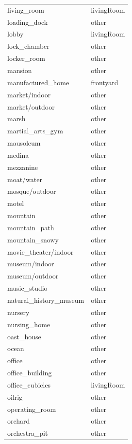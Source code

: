 \begin{table}[h!]
\begin{tabular}{| l | l |}
		living\_room &   livingRoom \\
		loading\_dock &        other \\
		lobby &   livingRoom \\
		lock\_chamber &        other \\
		locker\_room &        other \\
		mansion &        other \\
		manufactured\_home &    frontyard \\
		market/indoor &        other \\
		market/outdoor &        other \\
		marsh &        other \\
		martial\_arts\_gym &        other \\
		mausoleum &        other \\
		medina &        other \\
		mezzanine &        other \\
		moat/water &        other \\
		mosque/outdoor &        other \\
		motel &        other \\
		mountain &        other \\
		mountain\_path &        other \\
		mountain\_snowy &        other \\
		movie\_theater/indoor &        other \\
		museum/indoor &        other \\
		museum/outdoor &        other \\
		music\_studio &        other \\
		natural\_history\_museum &        other \\
		nursery &        other \\
		nursing\_home &        other \\
		oast\_house &        other \\
		ocean &        other \\
		office &        other \\
		office\_building &        other \\
		office\_cubicles &   livingRoom \\
		oilrig &        other \\
		operating\_room &        other \\
		orchard &        other \\
		orchestra\_pit &        other \\

\end{tabular}
\end{table}
